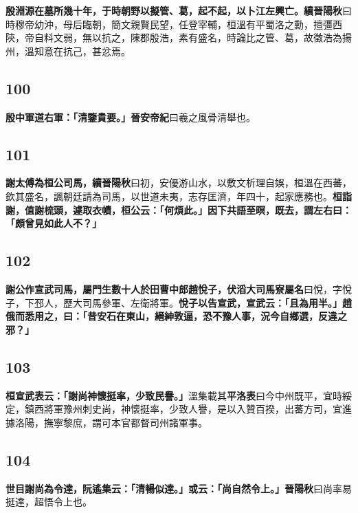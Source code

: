 \textbf{殷淵源在墓所幾十年，于時朝野以擬管、葛，起不起，以卜江左興亡。}{\footnotesize \textbf{續晉陽秋}曰時穆帝幼沖，母后臨朝，簡文親賢民望，任登宰輔，桓溫有平蜀洛之勳，擅彊西陝，帝自料文弱，無以抗之，陳郡殷浩，素有盛名，時論比之管、葛，故徵浩為揚州，溫知意在抗己，甚忿焉。}

\subsection*{100}

\textbf{殷中軍道右軍：「清鑒貴要。」}{\footnotesize \textbf{晉安帝紀}曰羲之風骨清舉也。}

\subsection*{101}

\textbf{謝太傅為桓公司馬，}{\footnotesize \textbf{續晉陽秋}曰初，安優游山水，以敷文析理自娛，桓溫在西蕃，欽其盛名，諷朝廷請為司馬，以世道未夷，志存匡濟，年四十，起家應務也。}\textbf{桓詣謝，值謝梳頭，遽取衣幘，桓公云：「何煩此。」因下共語至暝，既去，謂左右曰：「頗曾見如此人不？」}

\subsection*{102}

\textbf{謝公作宣武司馬，屬門生數十人於田曹中郎趙悅子，}{\footnotesize \textbf{伏滔大司馬寮屬名}曰悅，字悅子，下邳人，歷大司馬參軍、左衛將軍。}\textbf{悅子以告宣武，宣武云：「且為用半。」趙俄而悉用之，曰：「昔安石在東山，縉紳敦逼，恐不豫人事，況今自鄉選，反違之邪？」}

\subsection*{103}

\textbf{桓宣武表云：「謝尚神懷挺率，少致民譽。」}{\footnotesize 溫集載其\textbf{平洛表}曰今中州既平，宜時綏定，鎮西將軍豫州刺史尚，神懷挺率，少致人譽，是以入贊百揆，出蕃方司，宜進據洛陽，撫寧黎庶，謂可本官都督司州諸軍事。}

\subsection*{104}

\textbf{世目謝尚為令達，阮遙集云：「清暢似達。」或云：「尚自然令上。」}{\footnotesize \textbf{晉陽秋}曰尚率易挺達，超悟令上也。}

